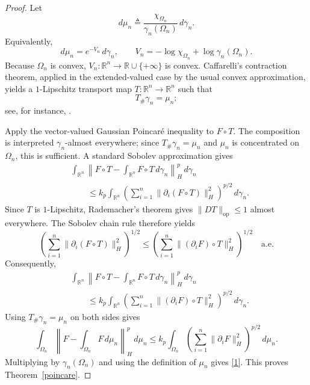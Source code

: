 \documentclass[12pt]{article}
\theoremstyle{plain}
\theoremstyle{definition}
\theoremstyle{remark}
\numberwithin{equation}{section}
\newcommand{\rr}{\mathbb{R}}
\begin{document}
\begin{proof}
Let
\[
d\mu_n
\triangleq
\frac{\chi_{\Omega_n}}{\gamma_n(\Omega_n)}\,d\gamma_n.
\]
Equivalently,
\[
d\mu_n=e^{-V_n}\,d\gamma_n,
\qquad
V_n=-\log\chi_{\Omega_n}+\log\gamma_n(\Omega_n).
\]
Because $\Omega_n$ is convex, $V_n:\rr^n\to\rr\cup\{+\infty\}$ is convex.  Caffarelli's contraction theorem, applied in the extended-valued case by the usual convex approximation, yields a $1$-Lipschitz transport map $T:\rr^n\to\rr^n$ such that
\[
T_{\#}\gamma_n=\mu_n;
\]
see, for instance, \cite[Theorem~2.2, p.~440]{GozlanJuillet}.

Apply the vector-valued Gaussian Poincar\'e inequality \cite[Theorem~2.6, p.~9]{AddonaMuratoriRossi} to $F\circ T$.  The composition is interpreted $\gamma_n$-almost everywhere; since $T_{\#}\gamma_n=\mu_n$ and $\mu_n$ is concentrated on $\Omega_n$, this is sufficient.  A standard Sobolev approximation gives
\[
\begin{aligned}
&\int_{\rr^n}
\left\|
F\circ T-
\int_{\rr^n}F\circ T\,d\gamma_n
\right\|_H^p
\,d\gamma_n
\\
&\qquad\leqslant
k_p
\int_{\rr^n}
\left(
\sum_{i=1}^n
\|\partial_i(F\circ T)\|_H^2
\right)^{p/2}
\,d\gamma_n.
\end{aligned}
\]
Since $T$ is $1$-Lipschitz, Rademacher's theorem gives $\|DT\|_{\mathrm{op}}\leqslant1$ almost everywhere.  The Sobolev chain rule therefore yields
\[
\left(
\sum_{i=1}^n\|\partial_i(F\circ T)\|_H^2
\right)^{1/2}
\leqslant
\left(
\sum_{i=1}^n\|(\partial_iF)\circ T\|_H^2
\right)^{1/2}
\quad\text{a.e.}
\]
Consequently,
\[
\begin{aligned}
&\int_{\rr^n}
\left\|
F\circ T-
\int_{\rr^n}F\circ T\,d\gamma_n
\right\|_H^p
\,d\gamma_n
\\
&\qquad\leqslant
k_p
\int_{\rr^n}
\left(
\sum_{i=1}^n
\|(\partial_iF)\circ T\|_H^2
\right)^{p/2}
\,d\gamma_n.
\end{aligned}
\]
Using $T_{\#}\gamma_n=\mu_n$ on both sides gives
\[
\int_{\Omega_n}
\left\|
F-\int_{\Omega_n}F\,d\mu_n
\right\|_H^p
\,d\mu_n
\leqslant
k_p
\int_{\Omega_n}
\left(
\sum_{i=1}^n\|\partial_iF\|_H^2
\right)^{p/2}
\,d\mu_n.
\]
Multiplying by $\gamma_n(\Omega_n)$ and using the definition of $\mu_n$ gives \eqref{1}.  This proves Theorem~\ref{poincare}.
\end{proof}
\end{document}
